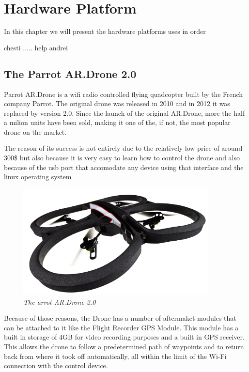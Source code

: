 \normalfont\normalsize
\chapter{Hardware Platform}

In this chapter we will present the hardware platforms uses in order 

chesti ..... help andrei


\clearpage

\section{The Parrot AR.Drone 2.0}

Parrot AR.Drone is a wifi radio controlled flying quadcopter built by the French company Parrot.
The original drone was released in 2010 and in 2012 it was replaced by version 2.0. Since the launch of the original AR.Drone, more the half a milion units have been sold, making it one of the, if not, the most popular drone on the market.

The reason of its success is not entirely due to the relatively low price of around 300\$ but also because it is very easy to learn how to control the drone and also because of the usb port that accomodate any device using that interface and the linux operating system


\begin{figure}[ht]
\begin{center}
\includegraphics[width=0.9\textwidth]{hw_platform/drone.jpg}
\end{center}
\caption{\small \itshape{The arrot AR.Drone 2.0}}
\end{figure}


Because of those reasons, the Drone has a number of aftermaket modules that can be attached to it like 
the Flight Recorder GPS Module. This module has a built in storage of 4GB for video recording purposes and a built in GPS receiver. This allows the drone to follow a predetermined path of waypoints and to return back from where it took off automatically, all within the limit of the Wi-Fi connection with the control device.
 

